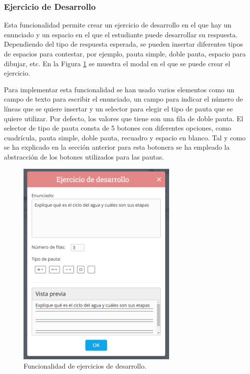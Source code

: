 \subsubsection{Ejercicio de Desarrollo}
\label{sec:impdesarrollo}
Esta funcionalidad permite crear un ejercicio de desarrollo en el que hay un enunciado y un espacio en el que el estudiante puede desarrollar su respuesta. Dependiendo del tipo de respuesta esperada, se pueden insertar diferentes tipos de espacios para contestar, por ejemplo, pauta simple, doble pauta, espacio para dibujar, etc. En la Figura \ref{fig:funcionalidadDesarrollo} se muestra el modal en el que se puede crear el ejercicio.

Para implementar esta funcionalidad se han usado varios elementos como un campo de texto para escribir el enunciado, un campo para indicar el número de líneas que se quiere insertar y un selector para elegir el tipo de pauta que se quiere utilizar. Por defecto, los valores que tiene son una fila de doble pauta. El selector de tipo de pauta consta de 5 botones con diferentes opciones, como cuadrícula, pauta simple, doble pauta, recuadro y espacio en blanco. Tal y como se ha explicado en la sección anterior para esta botonera se ha empleado la abstracción de los botones utilizados para las pautas.

\begin{figure}[ht!]
  \centering
  \includegraphics[width=0.7\textwidth]{Imagenes/Funcionalidades/DesarrolloModal.PNG}
  \caption{Funcionalidad de ejercicios de desarrollo.}
  \label{fig:funcionalidadDesarrollo}
\end{figure}

